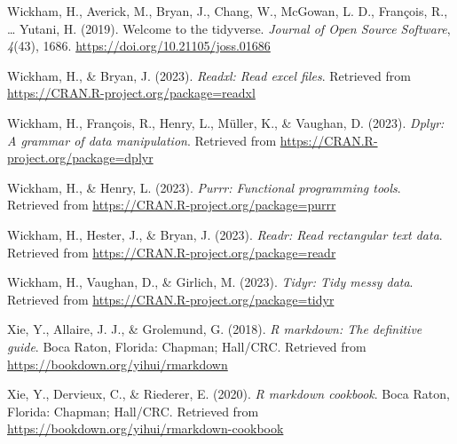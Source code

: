 \documentclass[
  man,floatsintext]{apa6}
\newlength{\cslhangindent}
\newlength{\cslentryspacingunit} %
\newenvironment{CSLReferences}[2] %
 {%
  \setlength{\parindent}{0pt}
  \ifodd #1
  \let\oldpar\par
  \def\par{\hangindent=\cslhangindent\oldpar}
  \fi
  \setlength{\parskip}{#2\cslentryspacingunit}
 }%
 {}
\begin{document}
\begin{CSLReferences}{1}{0}
\leavevmode{}%
Wickham, H., Averick, M., Bryan, J., Chang, W., McGowan, L. D., François, R., \ldots{} Yutani, H. (2019). Welcome to the {tidyverse}. \emph{Journal of Open Source Software}, \emph{4}(43), 1686. \url{https://doi.org/10.21105/joss.01686}

\leavevmode{}%
Wickham, H., \& Bryan, J. (2023). \emph{Readxl: Read excel files}. Retrieved from \url{https://CRAN.R-project.org/package=readxl}

\leavevmode{}%
Wickham, H., François, R., Henry, L., Müller, K., \& Vaughan, D. (2023). \emph{Dplyr: A grammar of data manipulation}. Retrieved from \url{https://CRAN.R-project.org/package=dplyr}

\leavevmode{}%
Wickham, H., \& Henry, L. (2023). \emph{Purrr: Functional programming tools}. Retrieved from \url{https://CRAN.R-project.org/package=purrr}

\leavevmode{}%
Wickham, H., Hester, J., \& Bryan, J. (2023). \emph{Readr: Read rectangular text data}. Retrieved from \url{https://CRAN.R-project.org/package=readr}

\leavevmode{}%
Wickham, H., Vaughan, D., \& Girlich, M. (2023). \emph{Tidyr: Tidy messy data}. Retrieved from \url{https://CRAN.R-project.org/package=tidyr}

\leavevmode{}%
Xie, Y., Allaire, J. J., \& Grolemund, G. (2018). \emph{R markdown: The definitive guide}. Boca Raton, Florida: Chapman; Hall/CRC. Retrieved from \url{https://bookdown.org/yihui/rmarkdown}

\leavevmode{}%
Xie, Y., Dervieux, C., \& Riederer, E. (2020). \emph{R markdown cookbook}. Boca Raton, Florida: Chapman; Hall/CRC. Retrieved from \url{https://bookdown.org/yihui/rmarkdown-cookbook}

\end{CSLReferences}
\end{document}

